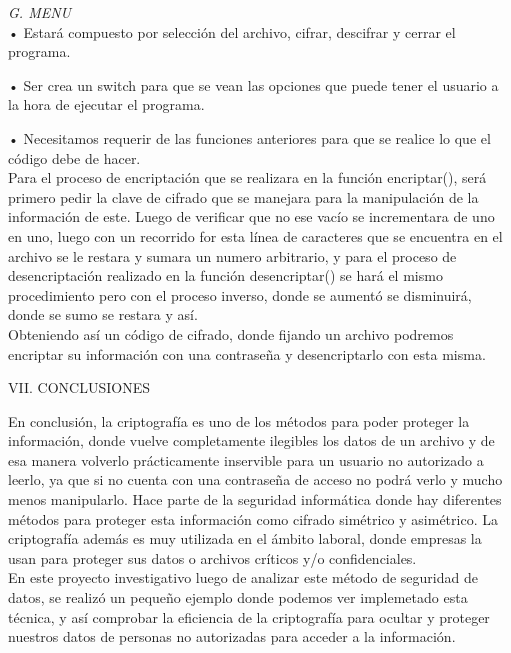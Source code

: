\documentclass[9pt,24pt,twocolumn]{article}
\begin{document}
\textit{G.  MENU}
\\

{•	Estará compuesto por selección del archivo, cifrar, descifrar y cerrar el programa.}

{•	Ser crea un switch para que se vean las opciones que puede tener el usuario a la hora de ejecutar el programa.}

{•	Necesitamos requerir de las funciones anteriores para que se realice lo que el código debe de hacer.}
\\

{Para el proceso de encriptación que se realizara en la función encriptar(), será primero pedir la clave de cifrado que se manejara para la manipulación de la información de este. Luego de verificar que no ese vacío se incrementara de uno en uno, luego con un recorrido for esta línea de caracteres que se encuentra en el archivo se le restara y sumara un numero arbitrario, y para el proceso de desencriptación realizado en la función desencriptar() se hará el mismo procedimiento pero con el proceso inverso, donde se aumentó se disminuirá, donde se sumo se restara y así.}
\\

{Obteniendo así un código de cifrado, donde fijando un archivo podremos encriptar su información con una contraseña y desencriptarlo con esta misma.}
\\

\begin{center}
{VII. CONCLUSIONES}
\end{center}

{En conclusión, la criptografía es uno de los métodos para poder proteger la información, donde vuelve completamente ilegibles los datos de un archivo y de esa manera volverlo prácticamente inservible para un usuario no autorizado a leerlo, ya que si no cuenta con una contraseña de acceso no podrá verlo y mucho menos manipularlo. Hace parte de la seguridad informática donde hay diferentes métodos para proteger esta información como cifrado simétrico y asimétrico. La criptografía además es muy utilizada en el ámbito laboral, donde empresas la usan para proteger sus datos o archivos críticos y/o confidenciales.}
\\

{En este proyecto investigativo luego de analizar este método de seguridad de datos, se realizó un pequeño ejemplo donde podemos ver implemetado esta técnica, y así comprobar la eficiencia de la criptografía para ocultar y proteger nuestros datos de personas no autorizadas para acceder a la información.}
\end{document}
